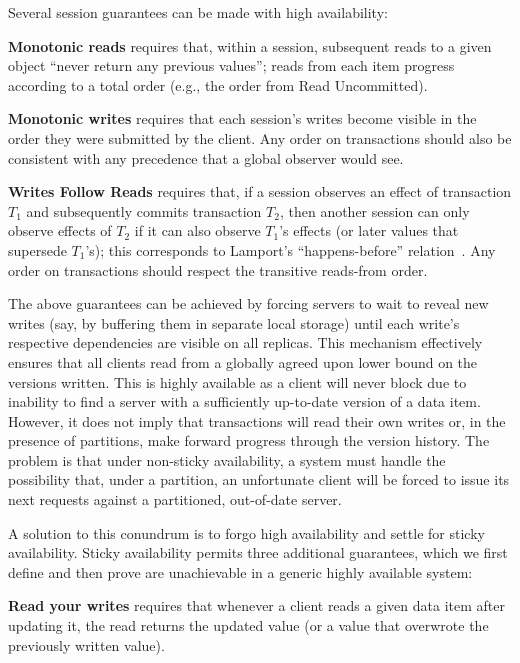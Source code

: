 Several session guarantees can be made with high availability:

\vspace{.5em}\noindent\textbf{{Monotonic reads}} requires that, within
a session, subsequent reads to a given object ``never return any
previous values''; reads from each item progress according to a total
order (e.g., the order from Read Uncommitted).

\vspace{.5em}\noindent\textbf{{Monotonic writes}} requires that each
session's writes become visible in the order they were submitted by
the client. Any order on transactions should also be consistent with
any precedence that a global observer would see.

\vspace{.5em}\noindent\textbf{{Writes Follow Reads}} requires that, if
a session observes an effect of transaction $T_1$ and subsequently
commits transaction $T_2$, then another session can only observe
effects of $T_2$ if it can also observe $T_1$'s effects (or later
values that supersede $T_1$'s); this corresponds to Lamport's
``happens-before'' relation~\cite{lamportclocks}.  Any order on
transactions should respect the transitive reads-from
order.\vspace{.5em}

The above guarantees can be achieved by forcing servers to wait to
reveal new writes (say, by buffering them in separate local storage)
until each write's respective dependencies are visible on all
replicas. This mechanism effectively ensures that all clients read
from a globally agreed upon lower bound on the versions written. This
is highly available as a client will never block due to inability to
find a server with a sufficiently up-to-date version of a data
item. However, it does not imply that transactions will read their own
writes or, in the presence of partitions, make forward progress
through the version history. The problem is that under non-sticky
availability, a system must handle the possibility that, under a
partition, an unfortunate client will be forced to issue its next
requests against a partitioned, out-of-date server.

A solution to this conundrum is to forgo high availability and settle
for sticky availability. Sticky availability permits three additional
guarantees, which we first define and then prove are unachievable in a
generic highly available system:

\vspace{.5em}\noindent\textbf{{Read your writes}} requires that
whenever a client reads a given data item after updating it, the read
returns the updated value (or a value that overwrote the previously
written value).

